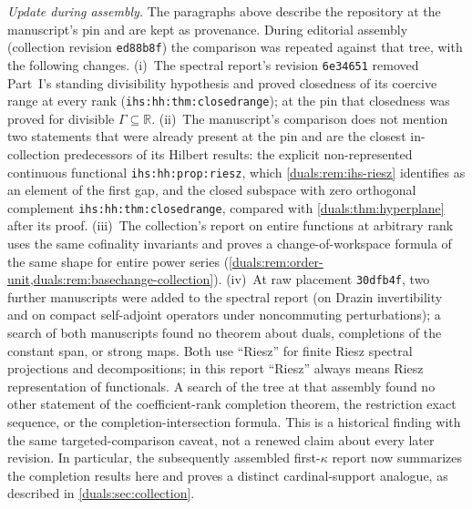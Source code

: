 \documentclass[11pt,letterpaper]{article}
\numberwithin{equation}{section}
\theoremstyle{definition}
\theoremstyle{remark}
\newcommand{\R}{\mathbb R}
\newcommand{\ihs}[1]{\texttt{ihs:#1}}
\begin{document}
\emph{Update during assembly.} The paragraphs above describe the repository at
the manuscript's pin and are kept as provenance. During editorial assembly
(collection revision \texttt{ed88b8f}) the comparison was repeated
against that tree, with the following changes. (i)~The spectral
report's revision \texttt{6e34651} removed Part~I's standing divisibility
hypothesis and proved closedness of its coercive range at every rank
(\ihs{hh:thm:closedrange}); at the pin that closedness was proved for
divisible $\Gamma\subseteq\R$. (ii)~The manuscript's comparison does not
mention two statements that were already present at the pin and are the
closest in-collection predecessors of its Hilbert results: the explicit
non-represented continuous functional \ihs{hh:prop:riesz}, which
\cref{duals:rem:ihs-riesz} identifies as an element of the first gap, and
the closed subspace with zero orthogonal complement
\ihs{hh:thm:closedrange}, compared with \cref{duals:thm:hyperplane} after
its proof. (iii)~The collection's report on entire functions at arbitrary
rank uses the same cofinality invariants and proves a change-of-workspace
formula of the same shape for entire power series
(\cref{duals:rem:order-unit,duals:rem:basechange-collection}). (iv)~At raw
placement \texttt{30dfb4f}, two further manuscripts were added to the spectral report
(on Drazin invertibility and on compact self-adjoint operators under
noncommuting perturbations); a search of both manuscripts found no
theorem about duals, completions of the constant span, or strong maps.
Both use ``Riesz'' for finite Riesz spectral projections and
decompositions; in this report ``Riesz'' always means Riesz
representation of functionals. A search of the
tree at that assembly found no other statement of the coefficient-rank
completion theorem, the restriction exact sequence, or the
completion-intersection formula. This is a historical finding with the
same targeted-comparison caveat, not a renewed claim about every later
revision. In particular, the subsequently assembled first-$\kappa$
report now summarizes the completion results here and proves a distinct
cardinal-support analogue, as described in \cref{duals:sec:collection}.
\end{document}
